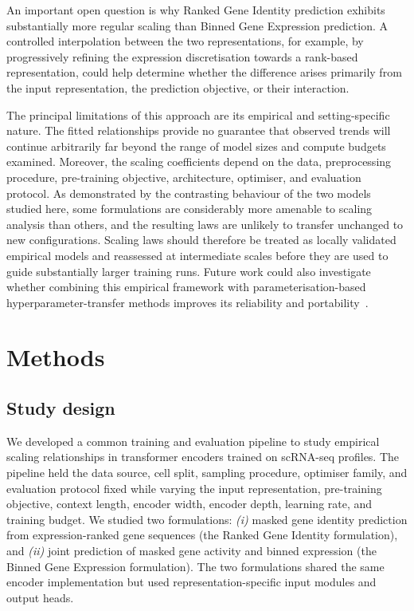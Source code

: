 \documentclass[pdflatex,sn-nature]{sn-jnl}%
\theoremstyle{thmstyleone}%
\theoremstyle{thmstyletwo}%
\theoremstyle{thmstylethree}%
\begin{document}
An important open question is why Ranked Gene Identity prediction exhibits substantially more regular scaling than Binned Gene Expression prediction. 
A controlled interpolation between the two representations, for example, by progressively refining the expression discretisation towards a rank-based representation, could help determine whether the difference arises primarily from the input representation, the prediction objective, or their interaction.

The principal limitations of this approach are its empirical and setting-specific nature. 
The fitted relationships provide no guarantee that observed trends will continue arbitrarily far beyond the range of model sizes and compute budgets examined. 
Moreover, the scaling coefficients depend on the data, preprocessing procedure, pre-training objective, architecture, optimiser, and evaluation protocol. 
As demonstrated by the contrasting behaviour of the two models studied here, some formulations are considerably more amenable to scaling analysis than others, and the resulting laws are unlikely to transfer unchanged to new configurations. 
Scaling laws should therefore be treated as locally validated empirical models and reassessed at intermediate scales before they are used to guide substantially larger training runs. 
Future work could also investigate whether combining this empirical framework with parameterisation-based hyperparameter-transfer methods improves its reliability and portability~\cite{yang2022tensorprogramsvtuning,yang2024tensor,mlodozeniec2026completed,ren2026rethinkinglanguagemodelscaling}.


\section{Methods}
\label{sec:methods}

\subsection{Study design}

We developed a common training and evaluation pipeline to study empirical scaling relationships in transformer encoders trained on scRNA-seq profiles.
The pipeline held the data source, cell split, sampling procedure, optimiser family, and evaluation protocol fixed while varying the input representation, pre-training objective, context length, encoder width, encoder depth, learning rate, and training budget.
We studied two formulations: \textit{(i)} masked gene identity prediction from expression-ranked gene sequences (the Ranked Gene Identity formulation), and \textit{(ii)} joint prediction of masked gene activity and binned expression (the Binned Gene Expression formulation).
The two formulations shared the same encoder implementation but used representation-specific input modules and output heads.
\end{document}
